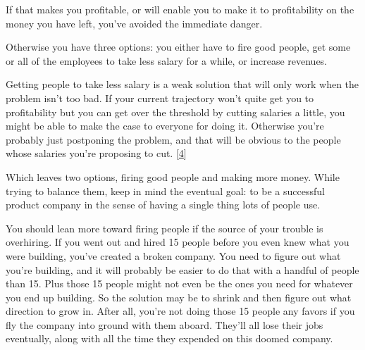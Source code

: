 If that makes you profitable, or
                  will enable you to make it to profitability on the money you
                  have left, you've avoided the immediate danger.

Otherwise
                  you have three options: you either have to fire good people,
                  get some or all of the employees to take less salary for a
                  while, or increase revenues.

Getting people to take
                  less salary is a weak solution that will only work when the
                  problem isn't too bad. If your current trajectory won't quite
                  get you to profitability but you can get over the threshold by
                  cutting salaries a little, you might be able to make the case
                  to everyone for doing it. Otherwise you're probably just
                  postponing the problem, and that will be obvious to the people
                  whose salaries you're proposing to cut.
                  [\href{\#f4n}{4}]

Which leaves two options, firing good people and
                  making more money. While trying to balance them, keep in mind
                  the eventual goal: to be a successful product company in the
                  sense of having a single thing lots of people use.

You
                  should lean more toward firing people if the source of your
                  trouble is overhiring. If you went out and hired 15 people
                  before you even knew what you were building, you've created a
                  broken company. You need to figure out what you're building,
                  and it will probably be easier to do that with a handful of
                  people than 15. Plus those 15 people might not even be the
                  ones you need for whatever you end up building. So the
                  solution may be to shrink and then figure out what direction
                  to grow in. After all, you're not doing those 15 people any
                  favors if you fly the company into ground with them aboard.
                  They'll all lose their jobs eventually, along with all the
                  time they expended on this doomed company.

